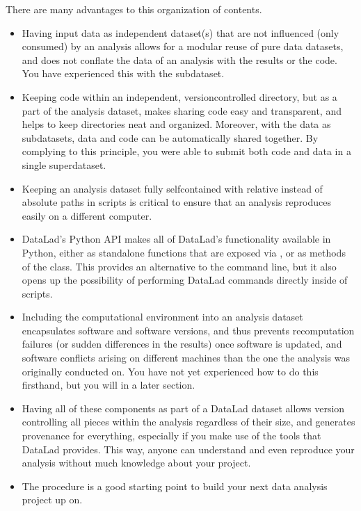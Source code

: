 \sphinxAtStartPar
There are many advantages to this organization of contents.
\begin{itemize}
\item {} 
\sphinxAtStartPar
Having input data as independent dataset(s) that are not influenced (only
consumed) by an analysis allows for a modular reuse of pure data datasets,
and does not conflate the data of an analysis with the results or the code.
You have experienced this with the  subdataset.

\item {} 
\sphinxAtStartPar
Keeping code within an independent, version\sphinxhyphen{}controlled directory, but as a part
of the analysis dataset, makes sharing code easy and transparent, and helps
to keep directories neat and organized. Moreover,
with the data as subdatasets, data and code can be automatically shared together.
By complying to this principle, you were able to submit both code and data
in a single superdataset.

\item {} 
\sphinxAtStartPar
Keeping an analysis dataset fully self\sphinxhyphen{}contained with relative instead of
absolute paths in scripts is critical to ensure that an analysis reproduces
easily on a different computer.

\item {} 
\sphinxAtStartPar
DataLad’s Python API makes all of DataLad’s functionality available in
Python, either as standalone functions that are exposed via ,
or as methods of the  class.
This provides an alternative to the command line, but it also opens up the
possibility of performing DataLad commands directly inside of scripts.

\item {} 
\sphinxAtStartPar
Including the computational environment into an analysis dataset encapsulates
software and software versions, and thus prevents re\sphinxhyphen{}computation failures
(or sudden differences in the results) once
software is updated, and software conflicts arising on different machines
than the one the analysis was originally conducted on. You have not yet
experienced how to do this first\sphinxhyphen{}hand, but you will in a later section.

\item {} 
\sphinxAtStartPar
Having all of these components as part of a DataLad dataset allows version
controlling all pieces within the analysis regardless of their size, and
generates provenance for everything, especially if you make use of the tools
that DataLad provides. This way, anyone can understand and even reproduce
your analysis without much knowledge about your project.

\item {} 
\sphinxAtStartPar
The  procedure is a good starting point to build your next data analysis
project up on.

\end{itemize}


